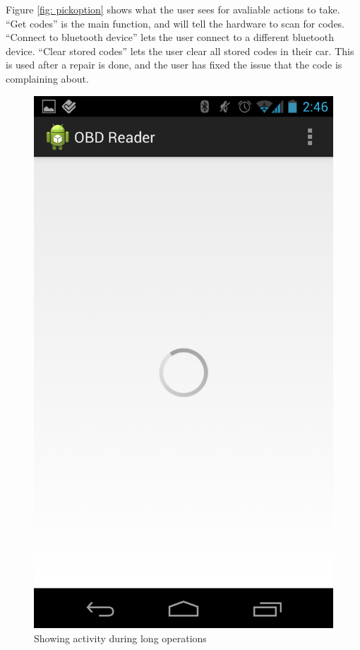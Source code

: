 \documentclass[12pt,letterpaper]{article}
\begin{document}
Figure \ref{fig: pickoption} shows what the user sees for avaliable actions to take. ``Get codes'' is the main function, and will tell the hardware to scan for codes. ``Connect to bluetooth device'' lets the user connect to a different bluetooth device. ``Clear stored codes'' lets the user clear all stored codes in their car. This is used after a repair is done, and the user has fixed the issue that the code is complaining about.

\begin{figure}[H]
\centering
\includegraphics[totalheight=15cm]{images/spinner.png}
\caption{Showing activity during long operations}
\label{fig: spinner}
\end{figure}
\end{document}
